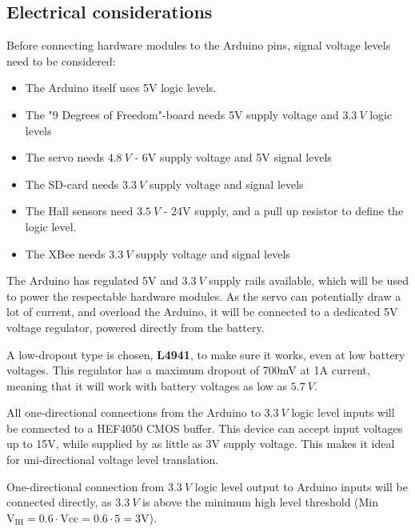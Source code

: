 \subsection{Electrical considerations}

Before connecting hardware modules to the Arduino pins, signal voltage levels need to be considered:

\begin{itemize}
\item The Arduino itself uses 5V logic levels.
\item The "9 Degrees of Freedom"-board needs 5V supply voltage and $\SI{3,3}{V}$ logic levels
\item The servo needs $\SI{4,8}{V}$ - 6V supply voltage and 5V signal levels
\item The SD-card needs $\SI{3,3}{V}$ supply voltage and signal levels
\item The Hall sensors need $\SI{3,5}{V}$ - 24V supply, and a pull up resistor to define the logic level.
\item The XBee needs $\SI{3,3}{V}$ supply voltage and signal levels
\end{itemize} 

The Arduino has regulated 5V and $\SI{3,3}{V}$ supply rails available, which will be used to power the respectable hardware modules. As the servo can potentially draw a lot of current, and overload the Arduino, it will be connected to a dedicated 5V voltage regulator, powered directly from the battery.

A low-dropout type is chosen, \textbf{L4941}, to make sure it works, even at low battery voltages. This regulator has a maximum dropout of 700mV at 1A current, meaning that it will work with battery voltages as low as $\SI{5,7}{V}$.  

All one-directional connections from the Arduino to  $\SI{3,3}{V}$ logic level inputs will be connected to a HEF4050 CMOS buffer. This device can accept input voltages up to 15V, while supplied by as little as 3V supply voltage. This makes it ideal for uni-directional voltage level translation. 

One-directional connection from  $\SI{3,3}{V}$ logic level output to Arduino inputs will be connected directly, as $\SI{3,3}{V}$ is above the minimum high level threshold (Min $\text{V}_\text{IH}=\SI{0,6}\cdot \text{Vcc} = \SI{0,6}\cdot 5 = 3$V). 

